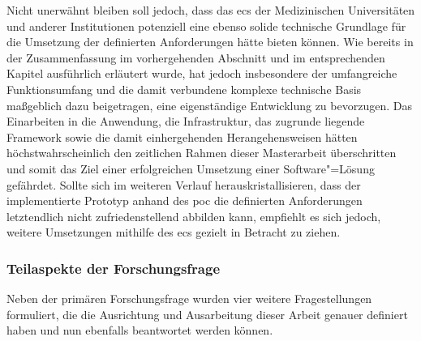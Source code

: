 \documentclass[a4paper,12pt,twoside]{scrreprt}
\begin{document}
Nicht unerwähnt bleiben soll jedoch, dass das \ac{ecs} der Medizinischen Universitäten und anderer Institutionen potenziell eine ebenso solide technische Grundlage für die Umsetzung der definierten Anforderungen hätte bieten können. Wie bereits in der Zusammenfassung im vorhergehenden Abschnitt und im entsprechenden Kapitel ausführlich erläutert wurde, hat jedoch insbesondere der umfangreiche Funktionsumfang und die damit verbundene komplexe technische Basis maßgeblich dazu beigetragen, eine eigenständige Entwicklung zu bevorzugen. Das Einarbeiten in die Anwendung, die Infrastruktur, das zugrunde liegende Framework sowie die damit einhergehenden Herangehensweisen hätten höchstwahrscheinlich den zeitlichen Rahmen dieser Masterarbeit überschritten und somit das Ziel einer erfolgreichen Umsetzung einer Software"=Lösung gefährdet. Sollte sich im weiteren Verlauf herauskristallisieren, dass der implementierte Prototyp anhand des \ac{poc} die definierten Anforderungen letztendlich nicht zufriedenstellend abbilden kann, empfiehlt es sich jedoch, weitere Umsetzungen mithilfe des \acl{ecs} gezielt in Betracht zu ziehen.


\subsubsection*{Teilaspekte der Forschungsfrage}

Neben der primären Forschungsfrage wurden vier weitere Fragestellungen formuliert, die die Ausrichtung und Ausarbeitung dieser Arbeit genauer definiert haben und nun ebenfalls beantwortet werden können.

\medskip
\end{document}
